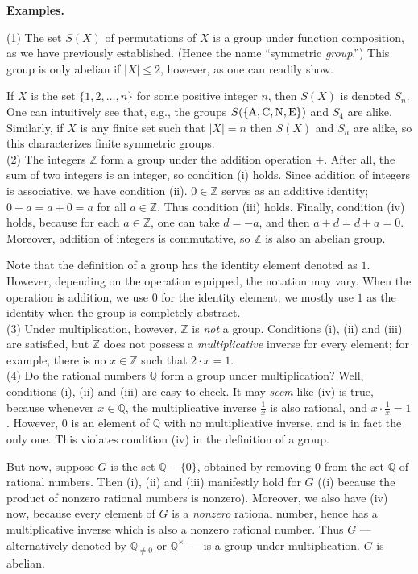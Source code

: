 \documentclass[leqno]{book}
\begin{document}
\noindent\textbf{Examples.}

(1) The set $S(X)$ of permutations of $X$ is a group under function composition, as we have previously established.  (Hence the name ``symmetric \emph{group}.'')  This group is only abelian if $|X|\leqslant 2$, however, as one can readily show.

If $X$ is the set $\{1,2,\dots,n\}$ for some positive integer $n$, then $S(X)$ is denoted $S_n$.  One can intuitively see that, e.g., the groups $S(\{\text A,\text C,\text N,\text E\})$ and $S_4$ are alike.  Similarly, if $X$ is any finite set such that $|X|=n$ then $S(X)$ and $S_n$ are alike, so this characterizes finite symmetric groups.\\

(2) The integers $\mathbb Z$ form a group under the addition operation $+$.  After all, the sum of two integers is an integer, so condition (i) holds.  Since addition of integers is associative, we have condition (ii).  $0\in\mathbb Z$ serves as an additive identity; $0+a=a+0=a$ for all $a\in\mathbb Z$.  Thus condition (iii) holds.  Finally, condition (iv) holds, because for each $a\in\mathbb Z$, one can take $d=-a$, and then $a+d=d+a=0$.  Moreover, addition of integers is commutative, so $\mathbb Z$ is also an abelian group.

Note that the definition of a group has the identity element denoted as $1$.  However, depending on the operation equipped, the notation may vary.  When the operation is addition, we use $0$ for the identity element; we mostly use $1$ as the identity when the group is completely abstract.\\

(3) Under multiplication, however, $\mathbb Z$ is \emph{not} a group.  Conditions (i), (ii) and (iii) are satisfied, but $\mathbb Z$ does not possess a \emph{multiplicative} inverse for every element; for example, there is no $x\in\mathbb Z$ such that $2\cdot x=1$.\\

(4) Do the rational numbers $\mathbb Q$ form a group under multiplication?  Well, conditions (i), (ii) and (iii) are easy to check.  It may \emph{seem} like (iv) is true, because whenever $x\in\mathbb Q$, the multiplicative inverse $\frac 1x$ is also rational, and $x\cdot\frac 1x=1$.  However, $0$ is an element of $\mathbb Q$ with no multiplicative inverse, and is in fact the only one.  This violates condition (iv) in the definition of a group.

But now, suppose $G$ is the set $\mathbb Q-\{0\}$, obtained by removing $0$ from the set $\mathbb Q$ of rational numbers.  Then (i), (ii) and (iii) manifestly hold for $G$ ((i) because the product of nonzero rational numbers is nonzero).  Moreover, we also have (iv) now, because every element of $G$ is a \emph{nonzero} rational number, hence has a multiplicative inverse which is also a nonzero rational number.  Thus $G$ \---- alternatively denoted by $\mathbb Q_{\ne 0}$ or $\mathbb Q^\times$ \---- is a group under multiplication.  $G$ is abelian.\\
\end{document}
